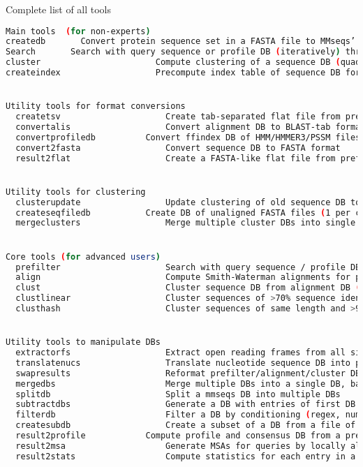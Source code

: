 \documentclass[11pt,a4paper]{scrreprt}
\begin{document}
Complete list of all tools
\begin{lstlisting}[language=bash, basicstyle=\footnotesize]
Main tools  (for non-experts)
createdb       Convert protein sequence set in a FASTA file to MMseqs’ sequence DB format
Search       Search with query sequence or profile DB (iteratively) through target sequence DB
cluster                       Compute clustering of a sequence DB (quadratic time)
createindex                   Precompute index table of sequence DB for faster searches


Utility tools for format conversions
  createtsv                     Create tab-separated flat file from prefilter DB, alignment DB, or cluster DB
  convertalis                   Convert alignment DB to BLAST-tab format, SAM flat file, or to raw pairwise alignments
  convertprofiledb          Convert ffindex DB of HMM/HMMER3/PSSM files to MMseqs profile DB
  convert2fasta                 Convert sequence DB to FASTA format
  result2flat                   Create a FASTA-like flat file from prefilter DB, alignment DB, or cluster DB


Utility tools for clustering
  clusterupdate                 Update clustering of old sequence DB to clustering of new sequence DB
  createseqfiledb           Create DB of unaligned FASTA files (1 per cluster) from sequence DB and cluster DB
  mergeclusters                 Merge multiple cluster DBs into single cluster DB


Core tools (for advanced users)
  prefilter                     Search with query sequence / profile DB through target DB (k-mer matching + ungapped alignment)
  align                         Compute Smith-Waterman alignments for previous results (e.g. prefilter DB, cluster DB)
  clust                         Cluster sequence DB from alignment DB (e.g. created by searching DB against itself)
  clustlinear                   Cluster sequences of >70% sequence identity *in linear time*
  clusthash                     Cluster sequences of same length and >90% sequence identity *in linear time*


Utility tools to manipulate DBs
  extractorfs                   Extract open reading frames from all six frames from nucleotide sequence DB
  translatenucs                 Translate nucleotide sequence DB into protein sequence DB
  swapresults                   Reformat prefilter/alignment/cluster DB as if target DB had been searched through query DB
  mergedbs                      Merge multiple DBs into a single DB, based on IDs (names) of entries
  splitdb                       Split a mmseqs DB into multiple DBs
  subtractdbs                   Generate a DB with entries of first DB not occurring in second DB
  filterdb                      Filter a DB by conditioning (regex, numerical, ...) on one of its whitespace-separated columns
  createsubdb                   Create a subset of a DB from a file of IDs of entries
  result2profile            Compute profile and consensus DB from a prefilter, alignment or cluster DB
  result2msa                    Generate MSAs for queries by locally aligning their matched targets in prefilter/alignment/cluster DB
  result2stats                  Compute statistics for each entry in a sequence, prefilter, alignment or cluster DB



\end{lstlisting}
\end{document}
